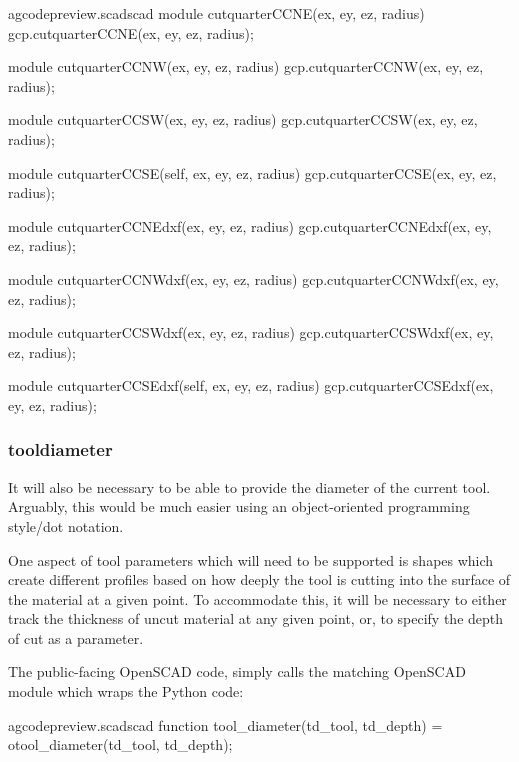 \documentclass{ltxdoc}
\begin{document}
\lstset{firstnumber=\thegcpscad}
\begin{writecode}{a}{gcodepreview.scad}{scad}
module cutquarterCCNE(ex, ey, ez, radius){
     gcp.cutquarterCCNE(ex, ey, ez, radius);
}

module cutquarterCCNW(ex, ey, ez, radius){
     gcp.cutquarterCCNW(ex, ey, ez, radius);
}

module cutquarterCCSW(ex, ey, ez, radius){
    gcp.cutquarterCCSW(ex, ey, ez, radius);
}

module cutquarterCCSE(self, ex, ey, ez, radius){
    gcp.cutquarterCCSE(ex, ey, ez, radius);
}

module cutquarterCCNEdxf(ex, ey, ez, radius){
     gcp.cutquarterCCNEdxf(ex, ey, ez, radius);
}

module cutquarterCCNWdxf(ex, ey, ez, radius){
     gcp.cutquarterCCNWdxf(ex, ey, ez, radius);
}

module cutquarterCCSWdxf(ex, ey, ez, radius){
    gcp.cutquarterCCSWdxf(ex, ey, ez, radius);
}

module cutquarterCCSEdxf(self, ex, ey, ez, radius){
    gcp.cutquarterCCSEdxf(ex, ey, ez, radius);
}

\end{writecode}
\addtocounter{gcpscad}{32}

\subsubsection{tooldiameter}

It will also be necessary to be able to provide the diameter of the current tool. Arguably, this would be much easier using an object-oriented programming style/dot notation.

One aspect of tool parameters which will need to be supported is shapes which create different profiles based on how deeply the tool is cutting into the surface of the material at a given point. To accommodate this, it will be necessary to either track the thickness of uncut material at any given point, or, to specify the depth of cut as a parameter.


The public-facing OpenSCAD code,  simply calls the matching OpenSCAD module which wraps the Python code:
 
\lstset{firstnumber=\thegcpscad}
\begin{writecode}{a}{gcodepreview.scad}{scad}
function tool_diameter(td_tool, td_depth) = otool_diameter(td_tool, td_depth);

\end{writecode}
\addtocounter{gcpscad}{2}
\end{document}

